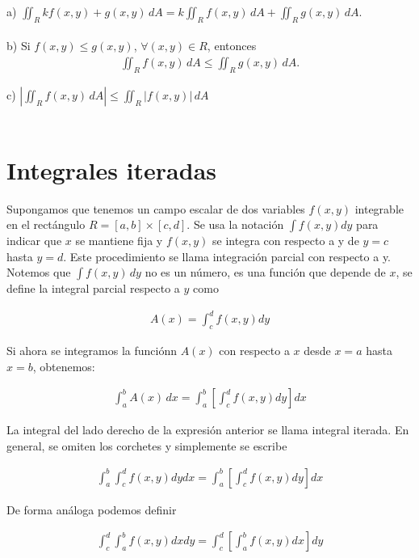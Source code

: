 \documentclass{article}
\theoremstyle{plain}
\theoremstyle{definition}
\begin{document}
a) $\displaystyle \iint_R kf(x,y)+g(x,y) \,dA = k\iint_R f(x,y)\,dA+ \iint_R g(x,y) \,dA.$ \\ \\

b) Si $f(x,y) \leq g(x,y) $, $\forall (x,y) \in R$, entonces
\begin{align*}
    \displaystyle \iint_R f(x,y)\,dA \leq \iint_R g(x,y) \,dA.
\end{align*}

c) $\displaystyle \left|\iint_R f(x,y) \,dA\right| \leq \iint_R |f(x,y)|\,dA$ \\ \\


\section{Integrales iteradas}


Supongamos que tenemos un campo escalar de dos variables $f (x, y )$ integrable en el rectángulo $R = [a, b] \times [c, d]$. Se usa la notación $\displaystyle \int f(x,y) dy$ para indicar que $x$ se mantiene fija y $f (x, y )$ se integra con respecto a y de $y = c$ hasta $y = d$. Este procedimiento se llama integración parcial con respecto a y. Notemos que $\displaystyle \int f(x,y) \,dy$ no es un número, es una  función que depende de $x$, se define la integral parcial respecto a $y$ como

\begin{align*}
    A(x) = \int_c^d f(x,y)dy
\end{align*}

Si ahora se integramos la funciónn $A (x)$ con respecto a $x$ desde $x = a$ hasta $x = b$, obtenemos:

\begin{align*}
    \int_a^b A(x) \,dx = \int_a^b \left[\int_c^d f(x,y)dy \right] dx
\end{align*}

La integral del lado derecho de la expresión anterior se llama integral iterada. En general, se omiten los corchetes y simplemente se escribe


\begin{align*}
     \int_a^b \int_c^d f(x,y)dy dx = \int_a^b \left[\int_c^d f(x,y)dy \right] dx
\end{align*}

De forma análoga podemos definir


\begin{align*}
     \int_c^d \int_a^b f(x,y)dx dy = \int_c^d \left[\int_a^b f(x,y)dx \right] dy
\end{align*}
\end{document}
